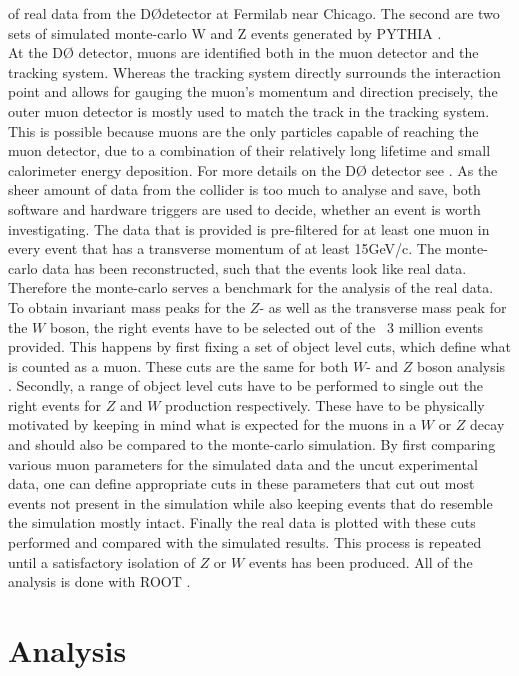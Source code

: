 \documentclass[twoside,        %
               BCOR12mm,       %
               ngerman,english, %
               fleqn,headsepline=false,footsepline=false
              ]{Vorlage/MFPREPORT}
\begin{document}
of real data from the D\O\;detector at Fermilab near Chicago. The second are two
sets of simulated monte-carlo W and Z events generated by PYTHIA
\cite{pythia}.\\
At the D\O\; detector, muons are identified  both in the muon detector and the
tracking system. Whereas the tracking system directly surrounds the interaction
point and allows for gauging the muon's momentum and direction precisely, the
outer muon detector is mostly used to match the track in the tracking system.
This is possible because muons are the only particles capable of reaching the
muon detector, due to a combination of their relatively long lifetime and small calorimeter energy deposition. For more details on the D\O\;  detector see
\cite{d0}.
As the sheer amount of data from the collider is too much to analyse and save,
both software and hardware triggers are used to decide, whether an event is
worth investigating. The data that is provided is pre-filtered for at least one
muon in every event that has a transverse momentum of at least 15\;GeV/c.
The monte-carlo data has been reconstructed, such that the
events look like real data. Therefore the monte-carlo serves a benchmark for
the analysis of the real data.
To obtain invariant mass peaks for the $Z$- as well as the transverse mass peak
for the $W$ boson, the right events have to be selected out of the ~3 million
events provided. This happens by first fixing a set of object level cuts, which
define what is counted as a muon. These cuts are the same for both $W$- and $Z$ boson analysis
. Secondly, a range of object level cuts have to be performed to single
out the right events for $Z$ and $W$ production respectively. These have to be
physically motivated by keeping in mind what is expected for the muons in a
$W$ or $Z$ decay and should also be compared to the monte-carlo simulation. By
first comparing various muon parameters for the simulated data and the uncut
experimental data, one can define appropriate cuts in these parameters that cut
out most events not present in the simulation while also keeping events that do
resemble the simulation mostly intact. Finally the real data is plotted with
these cuts performed and compared with the simulated results. This process is
repeated until a satisfactory isolation of $Z$ or $W$ events has been produced.
All of the analysis is done with ROOT \cite{root}.

\section{Analysis}
\label{sec:analysis}
\end{document}
